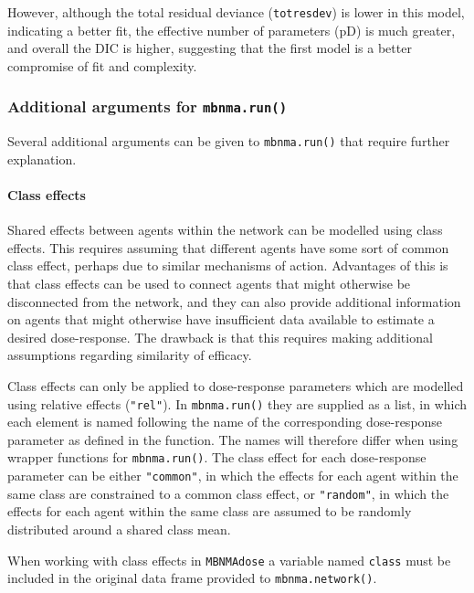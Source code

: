 \documentclass[]{article}
\let\oldparagraph\paragraph
\renewcommand{\paragraph}[1]{\oldparagraph{#1}\mbox{}}
\begin{document}
However, although the total residual deviance (\texttt{totresdev}) is
lower in this model, indicating a better fit, the effective number of
parameters (pD) is much greater, and overall the DIC is higher,
suggesting that the first model is a better compromise of fit and
complexity.

\hypertarget{additional-arguments-for-mbnma.run}{%
\subsubsection{\texorpdfstring{Additional arguments for
\texttt{mbnma.run()}}{Additional arguments for mbnma.run()}}\label{additional-arguments-for-mbnma.run}}

Several additional arguments can be given to \texttt{mbnma.run()} that
require further explanation.

\hypertarget{class-effects}{%
\paragraph{Class effects}\label{class-effects}}

Shared effects between agents within the network can be modelled using
class effects. This requires assuming that different agents have some
sort of common class effect, perhaps due to similar mechanisms of
action. Advantages of this is that class effects can be used to connect
agents that might otherwise be disconnected from the network, and they
can also provide additional information on agents that might otherwise
have insufficient data available to estimate a desired dose-response.
The drawback is that this requires making additional assumptions
regarding similarity of efficacy.

Class effects can only be applied to dose-response parameters which are
modelled using relative effects (\texttt{"rel"}). In
\texttt{mbnma.run()} they are supplied as a list, in which each element
is named following the name of the corresponding dose-response parameter
as defined in the function. The names will therefore differ when using
wrapper functions for \texttt{mbnma.run()}. The class effect for each
dose-response parameter can be either \texttt{"common"}, in which the
effects for each agent within the same class are constrained to a common
class effect, or \texttt{"random"}, in which the effects for each agent
within the same class are assumed to be randomly distributed around a
shared class mean.

When working with class effects in \texttt{MBNMAdose} a variable named
\texttt{class} must be included in the original data frame provided to
\texttt{mbnma.network()}.
\end{document}
